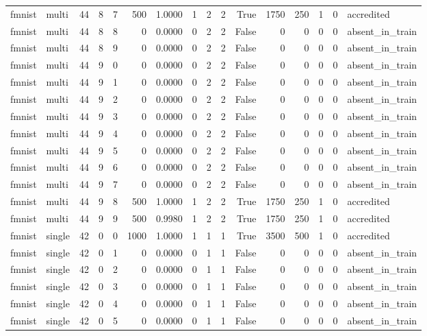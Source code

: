 \begin{tabular}{llrrrrrrrrrrrrrl}
fmnist & multi & 44 & 8 & 7 & 500 & 1.0000 & 1 & 2 & 2 & True & 1750 & 250 & 1 & 0 & accredited \\
fmnist & multi & 44 & 8 & 8 & 0 & 0.0000 & 0 & 2 & 2 & False & 0 & 0 & 0 & 0 & absent\_in\_train \\
fmnist & multi & 44 & 8 & 9 & 0 & 0.0000 & 0 & 2 & 2 & False & 0 & 0 & 0 & 0 & absent\_in\_train \\
fmnist & multi & 44 & 9 & 0 & 0 & 0.0000 & 0 & 2 & 2 & False & 0 & 0 & 0 & 0 & absent\_in\_train \\
fmnist & multi & 44 & 9 & 1 & 0 & 0.0000 & 0 & 2 & 2 & False & 0 & 0 & 0 & 0 & absent\_in\_train \\
fmnist & multi & 44 & 9 & 2 & 0 & 0.0000 & 0 & 2 & 2 & False & 0 & 0 & 0 & 0 & absent\_in\_train \\
fmnist & multi & 44 & 9 & 3 & 0 & 0.0000 & 0 & 2 & 2 & False & 0 & 0 & 0 & 0 & absent\_in\_train \\
fmnist & multi & 44 & 9 & 4 & 0 & 0.0000 & 0 & 2 & 2 & False & 0 & 0 & 0 & 0 & absent\_in\_train \\
fmnist & multi & 44 & 9 & 5 & 0 & 0.0000 & 0 & 2 & 2 & False & 0 & 0 & 0 & 0 & absent\_in\_train \\
fmnist & multi & 44 & 9 & 6 & 0 & 0.0000 & 0 & 2 & 2 & False & 0 & 0 & 0 & 0 & absent\_in\_train \\
fmnist & multi & 44 & 9 & 7 & 0 & 0.0000 & 0 & 2 & 2 & False & 0 & 0 & 0 & 0 & absent\_in\_train \\
fmnist & multi & 44 & 9 & 8 & 500 & 1.0000 & 1 & 2 & 2 & True & 1750 & 250 & 1 & 0 & accredited \\
fmnist & multi & 44 & 9 & 9 & 500 & 0.9980 & 1 & 2 & 2 & True & 1750 & 250 & 1 & 0 & accredited \\
fmnist & single & 42 & 0 & 0 & 1000 & 1.0000 & 1 & 1 & 1 & True & 3500 & 500 & 1 & 0 & accredited \\
fmnist & single & 42 & 0 & 1 & 0 & 0.0000 & 0 & 1 & 1 & False & 0 & 0 & 0 & 0 & absent\_in\_train \\
fmnist & single & 42 & 0 & 2 & 0 & 0.0000 & 0 & 1 & 1 & False & 0 & 0 & 0 & 0 & absent\_in\_train \\
fmnist & single & 42 & 0 & 3 & 0 & 0.0000 & 0 & 1 & 1 & False & 0 & 0 & 0 & 0 & absent\_in\_train \\
fmnist & single & 42 & 0 & 4 & 0 & 0.0000 & 0 & 1 & 1 & False & 0 & 0 & 0 & 0 & absent\_in\_train \\
fmnist & single & 42 & 0 & 5 & 0 & 0.0000 & 0 & 1 & 1 & False & 0 & 0 & 0 & 0 & absent\_in\_train \\

\end{tabular}
